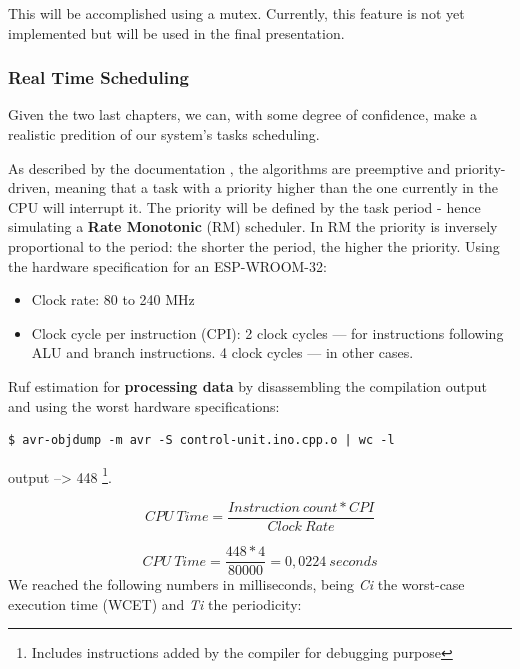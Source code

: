 \documentclass[11pt]{article}
\begin{document}
This will be accomplished using a mutex. Currently, this feature is not yet implemented but will be used in the final presentation.

\subsubsection{Real Time Scheduling}

Given the two last chapters, we can, with some degree of confidence, make a realistic predition of our system's tasks scheduling. 

As described by the documentation \cite{c1}, the algorithms are preemptive and priority- driven, meaning that a task with a priority higher than the one currently in the CPU will interrupt it. The priority will be defined by the task period - hence simulating a \textbf{Rate Monotonic} (RM) scheduler. In RM the priority is inversely proportional to the period: the shorter the period, the higher the priority. 
\newline
\newline
Using the hardware specification for an ESP-WROOM-32:
\begin{itemize}
	\item Clock rate: 80 to 240 MHz
	\item Clock cycle per instruction (CPI): 2 clock cycles — for instructions following ALU and branch instructions. 4 clock cycles — in other cases.
\end{itemize}

\noindent
Ruf estimation for \textbf{processing data} by disassembling the compilation output and using the worst hardware specifications:

\begin{verbatim}
$ avr-objdump -m avr -S control-unit.ino.cpp.o | wc -l
\end{verbatim}
output -->  448 \footnote{Includes instructions added by the compiler for debugging purpose}. 

\begin{equation} 
	CPU\ Time =  \frac{Instruction\ count * CPI}{Clock\ Rate}
\end{equation}

\begin{equation} 
	CPU\ Time =  \frac{448 * 4}{80 000} = 0,0224\ seconds
\end{equation}
\newline
\newline
We reached the following numbers in milliseconds, being \textit{Ci} the worst-case execution time (WCET) and \textit{Ti} the periodicity:
\end{document}

